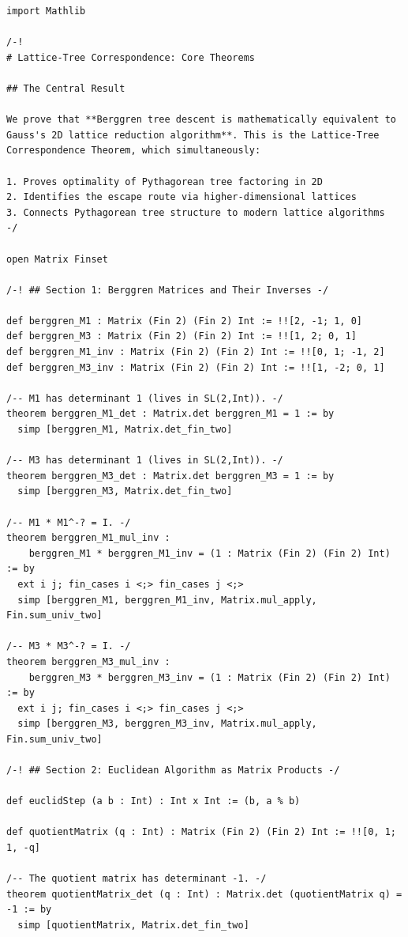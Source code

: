 \documentclass[11pt,twoside,openright]{book}
\theoremstyle{definition}
\theoremstyle{remark}
\begin{document}
\begin{lstlisting}[style=lean]
import Mathlib

/-!
# Lattice-Tree Correspondence: Core Theorems

## The Central Result

We prove that **Berggren tree descent is mathematically equivalent to
Gauss's 2D lattice reduction algorithm**. This is the Lattice-Tree
Correspondence Theorem, which simultaneously:

1. Proves optimality of Pythagorean tree factoring in 2D
2. Identifies the escape route via higher-dimensional lattices
3. Connects Pythagorean tree structure to modern lattice algorithms
-/

open Matrix Finset

/-! ## Section 1: Berggren Matrices and Their Inverses -/

def berggren_M1 : Matrix (Fin 2) (Fin 2) Int := !![2, -1; 1, 0]
def berggren_M3 : Matrix (Fin 2) (Fin 2) Int := !![1, 2; 0, 1]
def berggren_M1_inv : Matrix (Fin 2) (Fin 2) Int := !![0, 1; -1, 2]
def berggren_M3_inv : Matrix (Fin 2) (Fin 2) Int := !![1, -2; 0, 1]

/-- M1 has determinant 1 (lives in SL(2,Int)). -/
theorem berggren_M1_det : Matrix.det berggren_M1 = 1 := by
  simp [berggren_M1, Matrix.det_fin_two]

/-- M3 has determinant 1 (lives in SL(2,Int)). -/
theorem berggren_M3_det : Matrix.det berggren_M3 = 1 := by
  simp [berggren_M3, Matrix.det_fin_two]

/-- M1 * M1^-? = I. -/
theorem berggren_M1_mul_inv :
    berggren_M1 * berggren_M1_inv = (1 : Matrix (Fin 2) (Fin 2) Int) := by
  ext i j; fin_cases i <;> fin_cases j <;>
  simp [berggren_M1, berggren_M1_inv, Matrix.mul_apply, Fin.sum_univ_two]

/-- M3 * M3^-? = I. -/
theorem berggren_M3_mul_inv :
    berggren_M3 * berggren_M3_inv = (1 : Matrix (Fin 2) (Fin 2) Int) := by
  ext i j; fin_cases i <;> fin_cases j <;>
  simp [berggren_M3, berggren_M3_inv, Matrix.mul_apply, Fin.sum_univ_two]

/-! ## Section 2: Euclidean Algorithm as Matrix Products -/

def euclidStep (a b : Int) : Int x Int := (b, a % b)

def quotientMatrix (q : Int) : Matrix (Fin 2) (Fin 2) Int := !![0, 1; 1, -q]

/-- The quotient matrix has determinant -1. -/
theorem quotientMatrix_det (q : Int) : Matrix.det (quotientMatrix q) = -1 := by
  simp [quotientMatrix, Matrix.det_fin_two]


\end{lstlisting}
\end{document}
